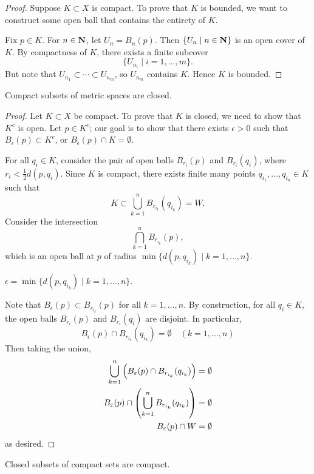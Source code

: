 \begin{proof}
Suppose $K\subset X$ is compact. To prove that $K$ is bounded, we want to construct some open ball that contains the entirety of $K$.

Fix $p\in K$. For $n\in\mathbf N$, let $U_n=B_n(p)$. Then $\{U_n\mid n\in\mathbf N\}$ is an open cover of $K$. By compactness of $K$, there exists a finite subcover
\[\{U_{n_i}\mid i=1,\dots,m\}.\]
But note that $U_{n_1}\subset\cdots\subset U_{n_m}$, so $U_{n_m}$ contains $K$. Hence $K$ is bounded.
\end{proof}

\begin{proposition}\label{prop:compact-closed}
Compact subsets of metric spaces are closed.
\end{proposition}

\begin{proof}
Let $K\subset X$ be compact. To prove that $K$ is closed, we need to show that $K^c$ is open. Let $p\in K^c$; our goal is to show that there exists $\epsilon>0$ such that $B_\epsilon(p)\subset K^c$, or $B_\epsilon(p)\cap K=\emptyset$.

For all $q_i\in K$, consider the pair of open balls $B_{r_i}(p)$ and $B_{r_i}(q_i)$, where $r_i<\frac{1}{2}d(p,q_i)$. Since $K$ is compact, there exists finite many points $q_{i_1},\dots,q_{i_n}\in K$ such that
\[K\subset\bigcup_{k=1}^{n}B_{r_{i_k}}(q_{i_k})=W.\]
Consider the intersection
\[\bigcap_{k=1}^{n}B_{r_{i_k}}(p),\]
which is an open ball at $p$ of radius $\min\{d(p,q_{i_k})\mid k=1,\dots,n\}$. 
\begin{claim}
$\epsilon=\min\{d(p,q_{i_k})\mid k=1,\dots,n\}$.
\end{claim}
Note that $B_\epsilon(p)\subset B_{r_{i_k}}(p)$ for all $k=1,\dots,n$. By construction, for all $q_i\in K$, the open balls $B_{r_i}(p)$ and $B_{r_i}(q_i)$ are disjoint. In particular,
\[B_\epsilon(p)\cap B_{r_{i_k}}(q_{i_k})=\emptyset\quad(k=1,\dots,n)\]
Then taking the union,
\begin{align*}
\bigcup_{k=1}^{n}\left(B_\varepsilon(p)\cap B_{r_{i_k}}(q_{i_k})\right)&=\emptyset\\
B_\varepsilon(p)\cap\left(\bigcup_{k=1}^{n}B_{r_{i_k}}(q_{i_k})\right)&=\emptyset\\
B_\varepsilon(p)\cap W&=\emptyset
\end{align*}
as desired.
\end{proof}

\begin{proposition}\label{prop:closed-compact}
Closed subsets of compact sets are compact.
\end{proposition}

